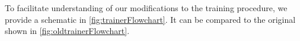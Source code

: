 
To facilitate understanding of our modifications to the training procedure, we provide a schematic in \autoref{fig:trainerFlowchart}. It can be compared to the original shown in \autoref{fig:oldtrainerFlowchart}.

